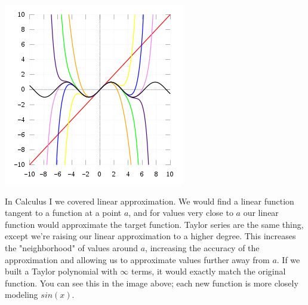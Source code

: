 \documentclass[12pt]{report}
\begin{document}
\includegraphics[scale=0.7]{taylor_series}

In Calculus I we covered linear approximation. We would find a linear function tangent to a function at a point $ a $, and for values very close to $ a $ our linear function would approximate the target function. Taylor series are the same thing, except we're raising our linear approximation to a higher degree. This increases the "neighborhood" of values around $ a $, increasing the accuracy of the approximation and allowing us to approximate values further away from $ a $. If we built a Taylor polynomial with $ \infty $ terms, it would exactly match the original function. You can see this in the image above; each new function is more closely modeling $ sin(x) $.

%
%
%


\end{document}
